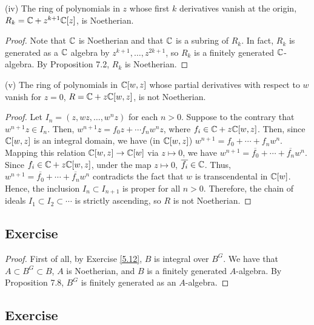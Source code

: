(iv) The ring of polynomials in $z$ whose first $k$ derivatives vanish at the origin, $R_k = \mathbb{C} + z^{k+1}\mathbb{C}[z]$, is Noetherian.

\begin{proof}
Note that $\mathbb{C}$ is Noetherian and that $\mathbb{C}$ is a subring of $R_k$. In fact, $R_k$ is generated as a $\mathbb{C}$ algebra by $z^{k+1},\ldots,z^{2k+1}$, so $R_k$ is a finitely generated 
$\mathbb{C}$-algebra. By Proposition 7.2, $R_k$ is Noetherian.
\end{proof}

(v) The ring of polynomials in $\mathbb{C}[w,z]$ whose partial derivatives with respect to $w$ vanish for $z = 0$, $R = \mathbb{C} + z\mathbb{C}[w,z]$, is not Noetherian.

\begin{proof}
Let $I_n = (z, wz, \ldots, w^n z)$ for each $n > 0$. Suppose to the contrary that $w^{n+1}z \in I_n$. Then, $w^{n+1}z = f_0 z + \cdots f_n w^n z$, where $f_i \in \mathbb{C} + z\mathbb{C}[w,z]$. Then,
since $\mathbb{C}[w,z]$ is an integral domain, we have (in $\mathbb{C}[w,z]$) $w^{n+1} = f_0 + \cdots + f_n w^n$. Mapping this relation $\mathbb{C}[w,z] \to \mathbb{C}[w]$ via $z \mapsto 0$, we have
$w^{n+1} = \overline{f_0} + \cdots + \overline{f_n} w^n$. Since $f_i \in \mathbb{C} + z\mathbb{C}[w,z]$, under the map $z \mapsto 0$, $\overline{f_i} \in \mathbb{C}$. Thus, 
$w^{n+1} = \overline{f_0} + \cdots + \overline{f_n} w^n$ contradicts the fact that $w$ is transcendental in $\mathbb{C}[w]$. Hence, the inclusion $I_n \subset I_{n+1}$ is proper for all $n > 0$.
Therefore, the chain of ideals $I_1 \subset I_2 \subset \cdots$ is strictly ascending, so $R$ is not Noetherian.
\end{proof}

\subsection{Exercise}\label{7.5}

\begin{proof}
First of all, by Exercise \ref{5.12}, $B$ is integral over $B^G$. We have that $A \subset B^G \subset B$, $A$ is Noetherian, and $B$ is a finitely generated $A$-algebra.
By Proposition 7.8, $B^G$ is finitely generated as an $A$-algebra.
\end{proof}

\subsection{Exercise}\label{7.6}

